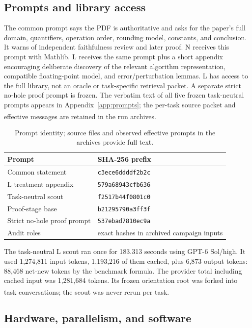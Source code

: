 \documentclass[10pt,a4paper]{article}
\newcommand{\src}[1]{\textsuperscript{\cite{#1}}}
\begin{document}
\subsection{Prompts and library access}

The common prompt says the PDF is authoritative and asks for the paper's
full domain, quantifiers, operation order, rounding model, constants, and
conclusion. It warns of independent faithfulness review and later proof.
N receives this prompt with Mathlib. L receives the same prompt plus a short
appendix encouraging deliberate discovery of the relevant algorithm
representation, compatible floating-point model, and error/perturbation
lemmas. L has access to the full library, not an oracle or task-specific
retrieval packet. A separate strict no-hole proof prompt is frozen. The
verbatim text of all five frozen task-neutral prompts appears in
Appendix~\ref{app:prompts}; the per-task source packet and effective
messages are retained in the run archives.\src{prompts,proofprompt,evidence}

\begin{table}[ht]\centering\small
\begin{tabular}{@{}ll@{}}\toprule
Prompt & SHA-256 prefix\\\midrule
Common statement & \texttt{c3ece6ddddf2b2c}\\
L treatment appendix & \texttt{579a68943cfb636}\\
Task-neutral scout & \texttt{f2517b44f0801c0}\\
Proof-stage base & \texttt{b21295790a3ff3f}\\
Strict no-hole proof prompt & \texttt{537ebad7810ec9a}\\
Audit roles & exact hashes in archived campaign inputs\\
\bottomrule\end{tabular}
\caption{Prompt identity; source files and observed effective prompts in the
archives provide full text.\cite{prompts,proofprompt,evidence}}
\end{table}

The task-neutral L scout ran once for 183.313 seconds using GPT-6 Sol/high.
It used 1,274,811 input tokens, 1,193,216 of them cached, plus 6,873 output
tokens: 88,468 net-new tokens by the benchmark formula. The provider total
including cached input was 1,281,684 tokens. Its frozen orientation root
was forked into task conversations; the scout was never rerun per task.
\src{warmroot,warmscout}

\subsection{Hardware, parallelism, and software}
\end{document}
